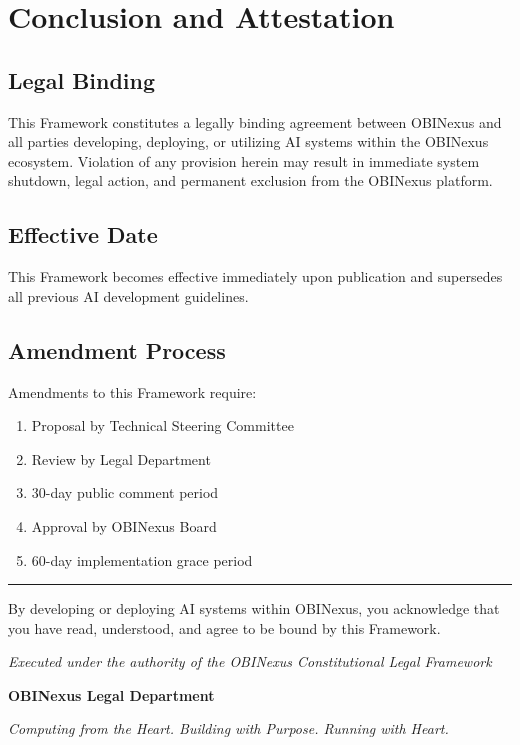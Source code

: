\documentclass[12pt,a4paper]{article}
\begin{document}
\section{Conclusion and Attestation}

\subsection{Legal Binding}

This Framework constitutes a legally binding agreement between OBINexus and all parties developing, deploying, or utilizing AI systems within the OBINexus ecosystem. Violation of any provision herein may result in immediate system shutdown, legal action, and permanent exclusion from the OBINexus platform.

\subsection{Effective Date}

This Framework becomes effective immediately upon publication and supersedes all previous AI development guidelines.

\subsection{Amendment Process}

Amendments to this Framework require:
\begin{enumerate}
    \item Proposal by Technical Steering Committee
    \item Review by Legal Department
    \item 30-day public comment period
    \item Approval by OBINexus Board
    \item 60-day implementation grace period
\end{enumerate}

\vspace{1cm}

\noindent\rule{\textwidth}{0.4pt}

\vspace{0.5cm}

\noindent By developing or deploying AI systems within OBINexus, you acknowledge that you have read, understood, and agree to be bound by this Framework.

\vspace{1cm}

\begin{center}
\textit{Executed under the authority of the OBINexus Constitutional Legal Framework}

\vspace{0.5cm}

\textbf{OBINexus Legal Department}

\textit{Computing from the Heart. Building with Purpose. Running with Heart.}
\end{center}
\end{document}
